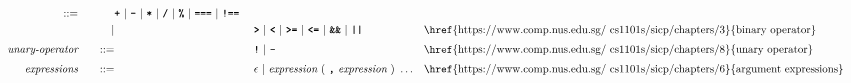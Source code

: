\begin{alignat*}{9}
                        && ::= &\quad && \textbf{\texttt{+}}\ |\ \textbf{\texttt{-}}\ |\ \textbf{\texttt{*}}\ |\ \textbf{\texttt{/}}\ |\ \textbf{\texttt{\%}}\ |\ 
                                   \textbf{\texttt{===}}\ |\ \textbf{\texttt{!==}}\ \\
&&                       && |  &\quad &&  \texttt{\textbf{>}}\ |\ \texttt{\textbf{<}}\ |\ \texttt{\textbf{>=}}\ |\ \texttt{\textbf{<=}}\
                                          |\ \textbf{\texttt{\&\&}}\ |\ \texttt{\textbf{||}}
                                          && \textrm{\href{https://www.comp.nus.edu.sg/~cs1101s/sicp/chapters/3}{binary operator}}\\[1mm]
&& \textit{unary-operator}    
                        && ::= &\quad && \textbf{\texttt{!}}\ |\ \textbf{\texttt{-}}
                        && \textrm{\href{https://www.comp.nus.edu.sg/~cs1101s/sicp/chapters/8}{unary operator}}\\[1mm]
&& \textit{expressions}  && ::= &\quad && \epsilon\ | \ \textit{expression}\ (
                                                               \ \textbf{\texttt{,}} \
                                                                 \textit{expression} \ 
                                                                      )\ \ldots
                                                            && \textrm{\href{https://www.comp.nus.edu.sg/~cs1101s/sicp/chapters/6}{argument expressions}}
\end{alignat*}
